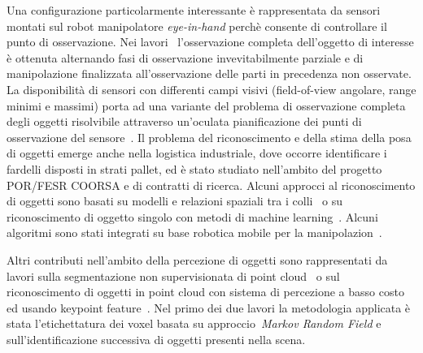 \documentclass[11pt]{article}
\begin{document}
\begin{itemize}
Una configurazione particolarmente interessante \`e rappresentata da sensori montati sul robot manipolatore 
\emph{eye-in-hand} perch\`e consente di controllare il punto di osservazione. 
Nei lavori~\cite{aleotti2014jirs,aleotti2012icra} l'osservazione completa dell'oggetto di interesse
\`e ottenuta alternando fasi di osservazione invevitabilmente parziale e di manipolazione finalizzata 
all'osservazione delle parti in precedenza non osservate.
La disponibilit\`a di sensori con differenti campi visivi (field-of-view angolare, range minimi e massimi) porta ad una variante del problema di osservazione completa degli oggetti risolvibile attraverso un'oculata pianificazione dei punti di osservazione del sensore~\cite{aleotti2014iros}. 
Il problema del riconoscimento e della stima della posa di oggetti emerge anche nella logistica industriale, dove occorre identificare i fardelli disposti in strati pallet, 
ed \`e stato studiato nell'ambito del progetto POR/FESR COORSA e di contratti di ricerca.
Alcuni approcci al riconoscimento di oggetti sono basati su modelli e relazioni spaziali tra i colli~\cite{monica2020irc, fontana2021iccp} o su riconoscimento di oggetto singolo con metodi di machine learning~\cite{fontana2021ecmr}. 
Alcuni algoritmi sono stati integrati su base robotica mobile per la manipolazion~\cite{chiaravalli2020etfa, aleotti2021ap}. 

Altri contributi nell'ambito della percezione di oggetti sono rappresentati da lavori sulla segmentazione non supervisionata di point cloud~\cite{lodirizzini2014ias} o sul riconoscimento di oggetti in point cloud con sistema di percezione a basso costo ed usando keypoint feature~\cite{oleari2013iccp}. 
Nel primo dei due lavori la metodologia applicata \`e stata l'etichettatura dei voxel basata su approccio~\emph{Markov Random Field} e sull'identificazione successiva di oggetti presenti nella scena. 

 

\end{itemize}
\end{document}
